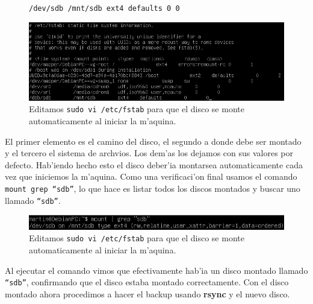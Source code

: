\documentclass[11pt]{article}
\newcommand{\codetext}[2]{\large\texttt{\textcolor{#1}{#2}}}
\newcommand{\rsync}[0]{\textbf{rsync }}
\begin{document}
		\begin{figure}[H]
			\centering
			\begin{code-box}
				\codetext{dark-gray}{/dev/sdb     /mnt/sdb      ext4        defaults      0       0}
			\end{code-box}
		\end{figure}
		
		\begin{figure}[H]
    			\centering
    			\includegraphics[scale=0.65]{Images/rsync/rsync_disk_automount.PNG}
    			\caption{Editamos \texttt{sudo vi /etc/fstab} para que el disco se monte automaticamente al iniciar la m'aquina.}
    			\label{fig:rsync_disk_automount}
		\end{figure}

		El primer elemento es el camino del disco, el segundo a donde debe ser montado y el tercero el sistema de archvios. Los dem'as los dejamos con sus valores por defecto. Hab'iendo hecho esto el disco deber'ia montarsea automaticamente cada vez que iniciemos la m'aquina. Como una verificaci'on final usamos el comando \texttt{mount \textbar\/ grep ``sdb''}, lo que hace es listar todos los discos montados y buscar uno llamado \texttt{``sdb''}.

		\begin{figure}[H]
    			\centering
    			\includegraphics[scale=0.65]{Images/rsync/rsync_disk_check.PNG}
    			\caption{Editamos \texttt{sudo vi /etc/fstab} para que el disco se monte automaticamente al iniciar la m'aquina.}
    			\label{fig:rsync_disk_check}
		\end{figure}

		Al ejecutar el comando vimos que efectivamente hab'ia un disco montado llamado \texttt{``sdb''}, confirmando que el disco estaba montado correctamente. Con el disco montado ahora procedimos a hacer el backup usando \rsync y el nuevo disco.
\end{document}
